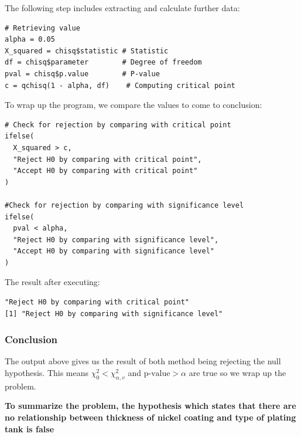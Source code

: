 \documentclass[a4paper]{article}
\numberwithin{equation}{section}
\begin{document}
The following step includes extracting and calculate further data:
\begin{mdframed}[leftline=false,rightline=false,backgroundcolor=magenta!10,nobreak=true]
  \begin{verbatim}
# Retrieving value
alpha = 0.05
X_squared = chisq$statistic # Statistic
df = chisq$parameter        # Degree of freedom
pval = chisq$p.value        # P-value
c = qchisq(1 - alpha, df)    # Computing critical point
  \end{verbatim}
\end{mdframed}

To wrap up the program, we compare the values to come to conclusion:
\begin{mdframed}[leftline=false,rightline=false,backgroundcolor=magenta!10,nobreak=true]
  \begin{verbatim}
# Check for rejection by comparing with critical point
ifelse(
  X_squared > c,
  "Reject H0 by comparing with critical point",
  "Accept H0 by comparing with critical point"
)

#Check for rejection by comparing with significance level
ifelse(
  pval < alpha,
  "Reject H0 by comparing with significance level",
  "Accept H0 by comparing with significance level"
)
  \end{verbatim}
\end{mdframed}

The result after executing:
\begin{mdframed}[leftline=false,rightline=false,backgroundcolor=magenta!10,nobreak=true]
  \begin{verbatim}
"Reject H0 by comparing with critical point"
[1] "Reject H0 by comparing with significance level"
  \end{verbatim}
\end{mdframed}

\subsubsection{Conclusion}
The output above gives us the result of both method being rejecting the null hypothesis. This means \(\chi_0^2 < \chi_{\alpha, v}^2\) and \(\text{p-value} > \alpha \) are true so we wrap up the problem.

\textbf{To summarize the problem, the hypothesis which states that there are no relationship between thickness of nickel coating and type of plating tank is false}
\end{document}
